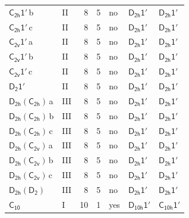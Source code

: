 \documentclass[10pt,a4paper]{article}
\numberwithin{equation}{section}
\newcommand{\grp}[1]{\mathsf{#1}}
\newcommand{\clsletter}[1]{\,{\scriptsize\color{black!55}#1}}
\begin{document}
{\begin{longtable}{@{}llrrlll@{}}
\href{C2h-1p.pdf}{$\grp{C_{2h}1'}$}\clsletter{b} & II & 8 & 5 & no & \href{D2h-1p.pdf}{$\grp{D_{2h}1'}$} & \href{D2h-1p.pdf}{$\grp{D_{2h}1'}$}\\
\href{C2h-1p.pdf}{$\grp{C_{2h}1'}$}\clsletter{c} & II & 8 & 5 & no & \href{D2h-1p.pdf}{$\grp{D_{2h}1'}$} & \href{D2h-1p.pdf}{$\grp{D_{2h}1'}$}\\
\href{C2v-1p.pdf}{$\grp{C_{2v}1'}$}\clsletter{a} & II & 8 & 5 & no & \href{D2h-1p.pdf}{$\grp{D_{2h}1'}$} & \href{D2h-1p.pdf}{$\grp{D_{2h}1'}$}\\
\href{C2v-1p.pdf}{$\grp{C_{2v}1'}$}\clsletter{b} & II & 8 & 5 & no & \href{D2h-1p.pdf}{$\grp{D_{2h}1'}$} & \href{D2h-1p.pdf}{$\grp{D_{2h}1'}$}\\
\href{C2v-1p.pdf}{$\grp{C_{2v}1'}$}\clsletter{c} & II & 8 & 5 & no & \href{D2h-1p.pdf}{$\grp{D_{2h}1'}$} & \href{D2h-1p.pdf}{$\grp{D_{2h}1'}$}\\
\href{D2-1p.pdf}{$\grp{D_{2}1'}$} & II & 8 & 5 & no & \href{D2h-1p.pdf}{$\grp{D_{2h}1'}$} & \href{D2h-1p.pdf}{$\grp{D_{2h}1'}$}\\
\href{D2h-C2h.pdf}{$\grp{D_{2h}}(\grp{C_{2h}})$}\clsletter{a} & III & 8 & 5 & no & \href{D2h-1p.pdf}{$\grp{D_{2h}1'}$} & \href{D2h-1p.pdf}{$\grp{D_{2h}1'}$}\\
\href{D2h-C2h.pdf}{$\grp{D_{2h}}(\grp{C_{2h}})$}\clsletter{b} & III & 8 & 5 & no & \href{D2h-1p.pdf}{$\grp{D_{2h}1'}$} & \href{D2h-1p.pdf}{$\grp{D_{2h}1'}$}\\
\href{D2h-C2h.pdf}{$\grp{D_{2h}}(\grp{C_{2h}})$}\clsletter{c} & III & 8 & 5 & no & \href{D2h-1p.pdf}{$\grp{D_{2h}1'}$} & \href{D2h-1p.pdf}{$\grp{D_{2h}1'}$}\\
\href{D2h-C2v.pdf}{$\grp{D_{2h}}(\grp{C_{2v}})$}\clsletter{a} & III & 8 & 5 & no & \href{D2h-1p.pdf}{$\grp{D_{2h}1'}$} & \href{D2h-1p.pdf}{$\grp{D_{2h}1'}$}\\
\href{D2h-C2v.pdf}{$\grp{D_{2h}}(\grp{C_{2v}})$}\clsletter{b} & III & 8 & 5 & no & \href{D2h-1p.pdf}{$\grp{D_{2h}1'}$} & \href{D2h-1p.pdf}{$\grp{D_{2h}1'}$}\\
\href{D2h-C2v.pdf}{$\grp{D_{2h}}(\grp{C_{2v}})$}\clsletter{c} & III & 8 & 5 & no & \href{D2h-1p.pdf}{$\grp{D_{2h}1'}$} & \href{D2h-1p.pdf}{$\grp{D_{2h}1'}$}\\
\href{D2h-D2.pdf}{$\grp{D_{2h}}(\grp{D_{2}})$} & III & 8 & 5 & no & \href{D2h-1p.pdf}{$\grp{D_{2h}1'}$} & \href{D2h-1p.pdf}{$\grp{D_{2h}1'}$}\\
\href{../../../rotation/data/pdf/C10.pdf}{$\grp{C_{10}}$} & I & 10 & 1 & yes & \href{D10h-1p.pdf}{$\grp{D_{10h}1'}$} & \href{C10h-1p.pdf}{$\grp{C_{10h}1'}$}\\

\end{longtable}}
\end{document}
